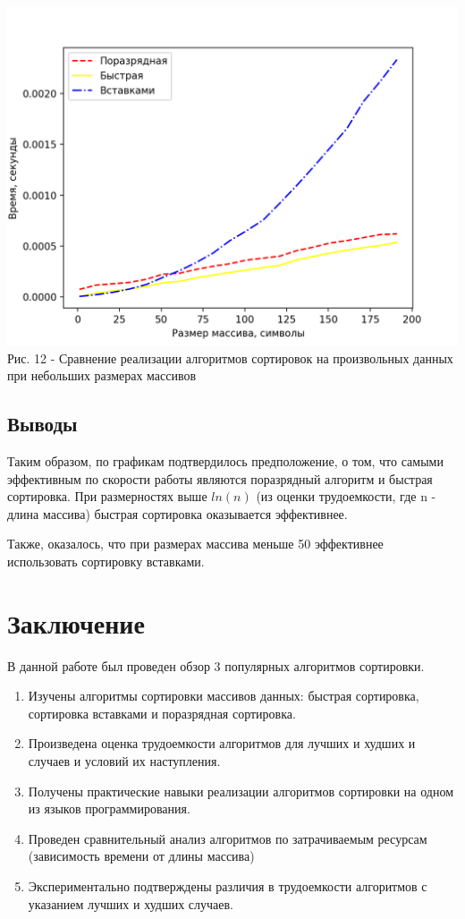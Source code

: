 \documentclass[a4paper,14pt]{article} %
\newcommand{\anonsection}[1]{\section*{#1}\addcontentsline{toc}{section}{#1}}
\begin{document}
	\begin{center}
        		\includegraphics[scale = 1]{graph7} \\ Рис. 12 - Сравнение реализации алгоритмов сортировок на произвольных данных при небольших размерах массивов
	\end{center}
	
		
	\subsection{Выводы}
	\hfill
	
	Таким образом, по графикам подтвердилось предположение, о том, что самыми эффективным по скорости работы являются поразрядный алгоритм и быстрая сортировка. При размерностях выше $ln(n)$ (из оценки трудоемкости, где n - длина массива) быстрая сортировка оказывается эффективнее. 
	
	Также, оказалось, что при размерах массива меньше 50 эффективнее использовать сортировку вставками. 
	
   	\newpage

        \anonsection{Заключение}
        
        \hfill
        
         В данной работе был проведен обзор 3 популярных алгоритмов сортировки. 
	\begin{enumerate}
		\item Изучены алгоритмы сортировки массивов данных: быстрая сортировка, сортировка вставками и поразрядная сортировка. 
		\item Произведена оценка трудоемкости алгоритмов для лучших и худших и случаев и условий их наступления. 
		\item Получены практические навыки реализации алгоритмов сортировки на одном из языков программирования. 
		\item Проведен сравнительный анализ алгоритмов по затрачиваемым ресурсам (зависимость времени от длины массива)
		\item Экспериментально подтверждены различия в трудоемкости алгоритмов с указанием лучших и худших случаев. 
	\end{enumerate}
	
\end{document}
